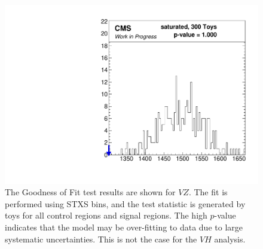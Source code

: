\begin{figure}
  \centering
  \includegraphics[width=0.65\linewidth]{figures/210308_STXS_VZ_XbbVZ_e4179c95_inclusive_gof/Gof_inclusive_.pdf}
  \caption[Goodness of Fit for $V\!Z$]{
    The Goodness of Fit test results are shown for $V\!Z$.
    The fit is performed using STXS bins,
    and the test statistic is generated by toys for all control regions and signal regions.
    The high $p$-value indicates that the model may be over-fitting to data due to large systematic uncertainties.
    This is not the case for the $V\!H$ analysis.
  }
  \label{fig:vz-gof}
\end{figure}

